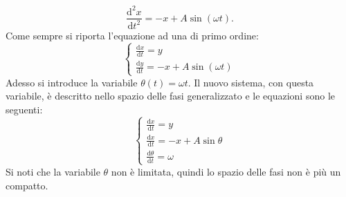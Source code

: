 \begin{exmp}
    \[
	\frac{\text{d} ^2x}{\text{d} t^2} = -x + A\sin (\omega t)
    .\] 
    Come sempre si riporta l'equazione ad una di primo ordine:
    \[
        \begin{cases}
            \frac{\text{d} x}{\text{d} t} = y \\
	    \frac{\text{d} y}{\text{d} t} = -x + A \sin (\omega t)
        \end{cases}
    \] 
    Adesso si introduce la variabile $\theta (t)=\omega t$. Il nuovo sistema, con questa variabile, è descritto nello spazio delle fasi generalizzato e le equazioni sono le seguenti:
    \[
        \begin{cases}
            \frac{\text{d} x}{\text{d} t} = y\\
	    \frac{\text{d} x}{\text{d} t} = -x + A\sin\theta\\
	    \frac{\text{d} \theta}{\text{d} t} =\omega
        \end{cases}
    \] 
    Si noti che la variabile $\theta$ non è limitata, quindi lo spazio delle fasi non è più un compatto.
\end{exmp}
